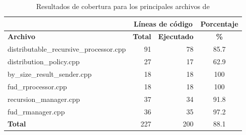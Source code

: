 \begin{table}[!htf]
    \begin{center}
    \begin{tabular}{|l|r|r|c|}
        \hline
        & \multicolumn{2}{|c|}{Líneas de código} & Porcentaje \\
        \hline
        \textbf{Archivo} & \textbf{Total} & \textbf{Ejecutado} & \hspace{0.2cm}\textbf{\%} \\
        \hline
        \scriptsize{distributable\_recursive\_processor.cpp} & 91 & 78 & 85.7 \\
        \hline 
        \scriptsize{distribution\_policy.cpp} & 27 & 17 & 62.9 \\
        \hline 
        \scriptsize{by\_size\_result\_sender.cpp} & 18 & 18 & 100 \\
        \hline 
        \scriptsize{fud\_rprocessor.cpp} & 18 & 18 & 100 \\
        \hline 
        \scriptsize{recursion\_manager.cpp} & 37 & 34 & 91.8 \\
        \hline 
        \scriptsize{fud\_rmanager.cpp} & 36 & 35 & 97.2 \\
        \hline 
        \textbf{Total} & 227 & 200 & 88.1 \\
        \hline
    \end{tabular}
    \caption{Resultados de cobertura para los principales archivos de \rc}
    \label{recabs_gcov}
    \end{center}
\end{table}
